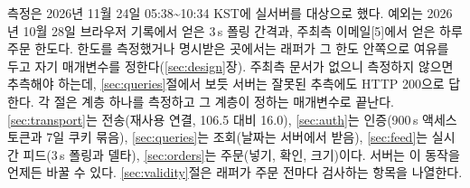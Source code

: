 \seclabel
{}

 측정은 2026년 11월 24일 05:38\textasciitilde 10:34 KST에 실서버를 대상으로 했다. 예외는 2026년 10월 28일 브라우저 기록에서 얻은 3\,s 폴링 간격과, 주최측 이메일[5]에서 얻은 하루 주문 한도다. 한도를 측정했거나 명시받은 곳에서는 래퍼가 그 한도 안쪽으로 여유를 두고 자기 매개변수를 정한다(\ref{sec:design}장). 주최측 문서가 없으니 측정하지 않으면 추측해야 하는데, \ref{sec:queries}절에서 보듯 서버는 잘못된 추측에도 HTTP 200으로 답한다. 각 절은 계층 하나를 측정하고 그 계층이 정하는 매개변수로 끝난다. \ref{sec:transport}는 전송(재사용 연결, 106.5\ms{} 대비 16.0\ms), \ref{sec:auth}는 인증(900\,s 액세스 토큰과 7일 쿠키 묶음), \ref{sec:queries}는 조회(날짜는 서버에서 받음), \ref{sec:feed}는 실시간 피드(3\,s 폴링과 델타), \ref{sec:orders}는 주문(넣기, 확인, 크기)이다. 서버는 이 동작을 언제든 바꿀 수 있다. \ref{sec:validity}절은 래퍼가 주문 전마다 검사하는 항목을 나열한다.
